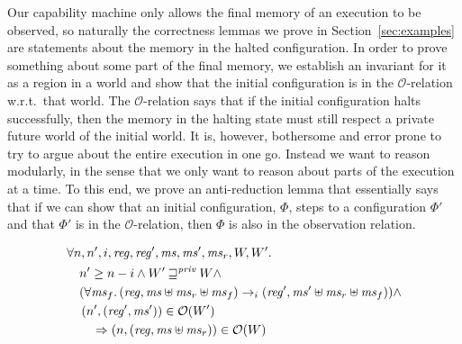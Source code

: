 \documentclass[format=acmsmall, review=true, screen=true]{acmart}
\renewcommand{\sectionname}{Section}
\newcommand{\var}[1]{\mathit{#1}}
\newcommand{\hs}{\var{ms}}
\newcommand{\ms}{\hs}
\newcommand{\reg}{\var{reg}}
\newcommand{\futurestr}{\mathbin{\sqsupseteq}^{\var{priv}}}
\newcommand{\observations}{\mathcal{O}}
\newcommand{\npair}[2][n]{\left(#1,#2 \right)}
\newcommand{\step}[1][]{\rightarrow_{#1}}
\newenvironment{toplas}{}{}
\begin{document}
\begin{toplas}
Our capability machine only allows the final memory of an execution to be
observed, so naturally the correctness lemmas we prove in
\sectionname~\ref{sec:examples} are statements about the memory in the halted
configuration. In order to prove something about some part of the final memory,
we establish an invariant for it as a region in a world and show that the
initial configuration is in the $\observations$-relation w.r.t.\ that world. The
$\observations$-relation says that if the initial configuration halts
successfully, then the memory in the halting state must still respect a private
future world of the initial world. It is, however, bothersome and error prone to
try to argue about the entire execution in one go. Instead we want to reason
modularly, in the sense that we only want to reason about parts of the execution
at a time. To this end, we prove an anti-reduction lemma that essentially says
that if we can show that an initial configuration, $\Phi$, steps to a
configuration $\Phi'$ and that $\Phi'$ is in the $\observations$-relation, then
$\Phi$ is also in the observation relation.
\begin{lemma}[Anti-reduction for $\observations$]
\label{lem:anti-red-obs}
  \begin{align*}
    & \forall n, n',i,\reg, \reg', \ms, \ms', \ms_r, W, W' \ldotp\\
    & \quad n' \geq n - i \land W' \futurestr W \land \\
    & \quad (\forall \ms_f \ldotp (\reg,\ms \uplus \ms_r \uplus \ms_f) \step[i] (\reg',\ms' \uplus \ms_r \uplus \ms_f)) \land \\
    & \quad \npair[n']{(\reg',\ms')} \in \observations(W') \\
    & \qquad \Rightarrow \npair{(\reg,\ms \uplus \ms_r)} \in \observations(W)
  \end{align*}
\end{lemma}


\end{toplas}
\end{document}

